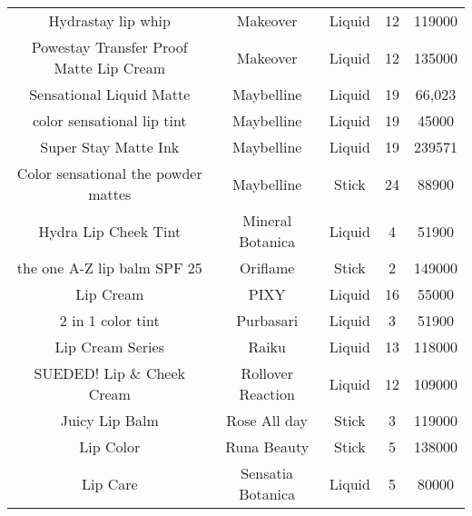 \begin{table}[htbp]
\begin{tabular}{ccccc}
        Hydrastay lip whip                      & Makeover          & Liquid                       & 12              & 119000         \\
        Powestay Transfer Proof Matte Lip Cream & Makeover          & Liquid                       & 12              & 135000         \\
        Sensational Liquid Matte                & Maybelline        & Liquid                       & 19              & 66,023         \\
        color sensational lip tint              & Maybelline        & Liquid                       & 19              & 45000          \\
        Super Stay Matte Ink                    & Maybelline        & Liquid                       & 19              & 239571         \\
        Color sensational the powder mattes     & Maybelline        & Stick                        & 24              & 88900          \\
        Hydra Lip Cheek Tint                    & Mineral Botanica  & Liquid                       & 4               & 51900          \\
        the one A-Z lip balm SPF 25             & Oriflame          & Stick                        & 2               & 149000         \\
        Lip Cream                               & PIXY              & Liquid                       & 16              & 55000          \\
        2 in 1 color tint                       & Purbasari         & Liquid                       & 3               & 51900          \\
        Lip Cream Series                        & Raiku             & Liquid                       & 13              & 118000         \\
        SUEDED! Lip \& Cheek Cream              & Rollover Reaction & Liquid                       & 12              & 109000         \\
        Juicy Lip Balm                          & Rose All day      & Stick                        & 3               & 119000         \\
        Lip Color                               & Runa Beauty       & Stick                        & 5               & 138000         \\
        Lip Care                                & Sensatia Botanica & Liquid                       & 5               & 80000          \\

\end{tabular}
\end{table}
